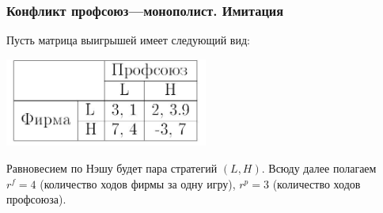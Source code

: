 \documentclass {beamer}
\begin{document}
\begin{frame}
\frametitle{Конфликт профсоюз---монополист. Имитация}
		Пусть матрица выигрышей имеет следующий вид:
		
		\begin{center}
			\includegraphics[width=0.5\textwidth]{seventh}
		\end{center}
		
		 Равновесием по Нэшу будет пара стратегий $(L,H)$.
		Всюду далее полагаем $r^f= 4 $ (количество ходов фирмы за одну игру),
		$r^p= 3$ (количество ходов профсоюза). 
\end{frame}
\end{document}
